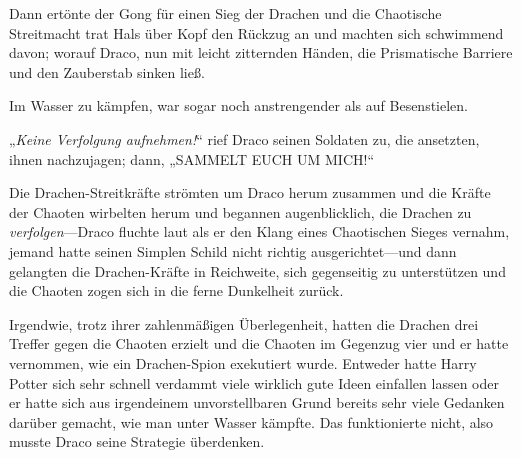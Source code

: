 Dann ertönte der Gong für einen Sieg der Drachen und die Chaotische Streitmacht trat Hals über Kopf den Rückzug an und machten sich schwimmend davon; worauf Draco, nun mit leicht zitternden Händen, die Prismatische Barriere und den Zauberstab sinken ließ.

Im Wasser zu kämpfen, war sogar noch anstrengender als auf Besenstielen.

„\emph{Keine Verfolgung aufnehmen!}“ rief Draco seinen Soldaten zu, die ansetzten, ihnen nachzujagen; dann,  „SAMMELT EUCH UM MICH!“

Die Drachen-Streitkräfte strömten um Draco herum zusammen und die Kräfte der Chaoten wirbelten herum und begannen augenblicklich, die Drachen zu \emph{verfolgen}—Draco fluchte laut als er den Klang eines Chaotischen Sieges vernahm, jemand hatte seinen Simplen Schild nicht richtig ausgerichtet—und dann gelangten die Drachen-Kräfte in Reichweite, sich gegenseitig zu unterstützen und die Chaoten zogen sich in die ferne Dunkelheit zurück.

Irgendwie, trotz ihrer zahlenmäßigen Überlegenheit, hatten die Drachen drei Treffer gegen die Chaoten erzielt und die Chaoten im Gegenzug vier und er hatte vernommen, wie ein Drachen-Spion exekutiert wurde. Entweder hatte Harry Potter sich sehr schnell verdammt viele wirklich gute Ideen einfallen lassen oder er hatte sich aus irgendeinem unvorstellbaren Grund bereits sehr viele Gedanken darüber gemacht, wie man unter Wasser kämpfte. Das funktionierte nicht, also musste Draco seine Strategie überdenken.

